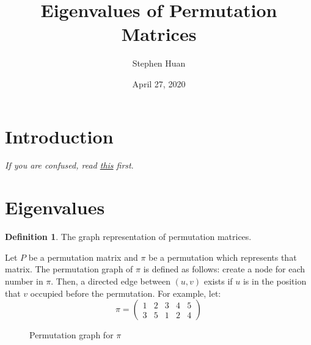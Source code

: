 \documentclass[11pt, oneside]{article}
\title{Eigenvalues of Permutation Matrices}
\author{Stephen Huan}
\date{April 27, 2020}
\theoremstyle{plain}
\theoremstyle{definition}
\newtheorem{definition}{Definition}[section]
\begin{document}
\maketitle

\section{Introduction}

\textit{If you are confused, read \href{https://activities.tjhsst.edu/cubing/static/pdfs/Linearization/linear.pdf}{this} first}.

\section{Eigenvalues}

\begin{definition}
The graph representation of permutation matrices.
\end{definition}

Let \( P \) be a permutation matrix and \( \pi \) be a permutation which
represents that matrix. The permutation graph of \( \pi \) is defined
as follows: create a node for each number in \( \pi \).
Then, a directed edge between \( (u, v) \) exists if \( u \)
is in the position that \( v \) occupied before the permutation.
For example, let:
\[ \pi = \begin{pmatrix}
         1 & 2 & 3 & 4 & 5 \\
         3 & 5 & 1 & 2 & 4
        \end{pmatrix}
\]

\begin{figure}[h!]
    \centering
    \caption{Permutation graph for \( \pi \)}
\end{figure}
\end{document}
